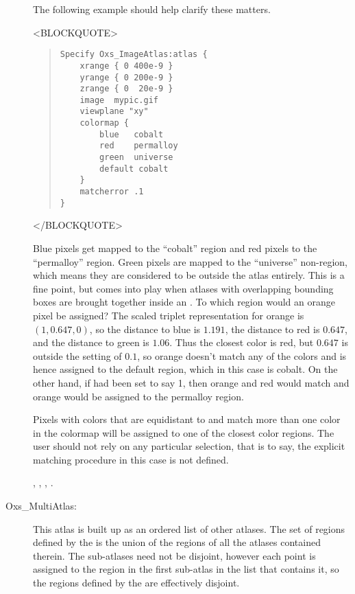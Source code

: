 \begin{description}
The following example should help clarify these matters.
\begin{rawhtml}
<BLOCKQUOTE>
\end{rawhtml}
\begin{quote}
\begin{verbatim}
Specify Oxs_ImageAtlas:atlas {
    xrange { 0 400e-9 }
    yrange { 0 200e-9 }
    zrange { 0  20e-9 }
    image  mypic.gif
    viewplane "xy"
    colormap {
        blue   cobalt
        red    permalloy
        green  universe
        default cobalt
    }
    matcherror .1
}
\end{verbatim}
\end{quote}
\begin{rawhtml}
</BLOCKQUOTE>
\end{rawhtml}
Blue pixels get mapped to the ``cobalt'' region and red pixels
to the ``permalloy'' region.  Green pixels are mapped to the
``universe'' non-region, which means they are considered to be outside
the atlas entirely.  This is a fine point, but comes into
play when atlases with overlapping bounding boxes are brought together
inside an .  To which region would an orange pixel
be assigned?  The scaled triplet representation for orange is
$(1,0.647,0)$, so the distance to blue is $1.191$, the distance to red
is $0.647$, and the distance to green is $1.06$.  Thus the closest color
is red, but $0.647$ is outside the  setting of $0.1$, so
orange doesn't match any of the colors and is hence assigned to the
default region, which in this case is cobalt.  On the other hand, if
 had been set to say 1, then orange and red would match
and orange would be assigned to the permalloy region.

Pixels with colors that are equidistant to and match more than one color
in the colormap will be assigned to one of the closest color regions.
The user should not rely on any particular selection, that is to say,
the explicit matching procedure in this case is not defined.

\begin{ExampleMifs}
 , , , .
\end{ExampleMifs}

%
\item[Oxs\_MultiAtlas:]
This atlas is built up as an ordered list of
other atlases.  The set of regions defined by the 
is the union of the regions of all the atlases contained therein.  The
sub-atlases need not be disjoint, however each point is assigned to the
region in the first sub-atlas in the list that contains it, so the
regions defined by the  are effectively disjoint.


\end{description}
